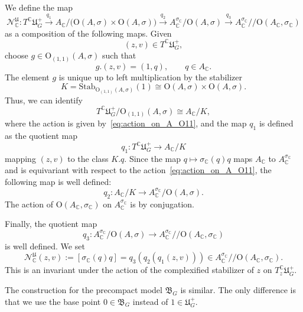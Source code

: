 \documentclass[oneside,11pt]{amsart}
\theoremstyle{definition}
\theoremstyle{remark}
\numberwithin{thm}{section}
\numberwithin{equation}{section}
\begin{document}
We define the map
\[
\mathcal N_{\mathbb{C}}^{\mathfrak U}: T^{\mathbb{C}}\mathfrak U_G^+\xrightarrow{q_1} A_{\mathbb{C}}/\bigl(\mathrm{O}(A,\sigma)\times\mathrm{O}(A,\sigma)\bigr)\xrightarrow{q_2}A_{\mathbb{C}}^{\sigma_{\mathbb{C}}}/\mathrm{O}(A,\sigma)\xrightarrow{q_3} A_{\mathbb{C}}^{\sigma_{\mathbb{C}}}/\!\!/\mathrm{O}(A_{\mathbb{C}},\sigma_{\mathbb{C}})
\]
as a composition of the following maps. Given
\[
(z,v)\in T^{\mathbb{C}}\mathfrak U_G^+,
\]
choose $g\in \mathrm{O}_{(1,1)}(A,\sigma)$ such that
\[
g.(z,v)=(1,q), \qquad q\in A_{\mathbb{C}}.
\]
The element $g$ is unique up to left multiplication by the stabilizer
\[
K=\mathrm{Stab}_{\mathrm{O}_{(1,1)}(A,\sigma)}(1)\cong\mathrm{O}(A,\sigma)\times\mathrm{O}(A,\sigma).
\]
Thus, we can identify
\[
T^{\mathbb{C}}\mathfrak U_G^+/\mathrm{O}_{(1,1)}(A,\sigma)\cong A_{\mathbb{C}}/K,
\]
where the action is given by~\eqref{eq:action_on_A_O11}, and the map $q_1$ is defined as the quotient map
\[
q_1: T^{\mathbb{C}}\mathfrak U_G^+\longrightarrow A_{\mathbb{C}}/K
\]
mapping $(z,v)$ to the class $K.q$. Since the map $q\longmapsto \sigma_{\mathbb{C}}(q)q$ maps $A_{\mathbb{C}}$ to $A_{\mathbb{C}}^{\sigma_{\mathbb{C}}}$ and is equivariant with respect to the action~\eqref{eq:action_on_A_O11}, the following map is well defined:
\[
q_2: A_{\mathbb{C}}/K\longrightarrow A_{\mathbb{C}}^{\sigma_{\mathbb{C}}}/\mathrm{O}(A,\sigma).
\]
The action of $\mathrm{O}(A_{\mathbb{C}},\sigma_{\mathbb{C}})$ on $A_{\mathbb{C}}^{\sigma_{\mathbb{C}}}$ is by conjugation.

Finally, the quotient map
\[
q_3: A_{\mathbb{C}}^{\sigma_{\mathbb{C}}}/\mathrm{O}(A,\sigma)\longrightarrow
A_{\mathbb{C}}^{\sigma_{\mathbb{C}}}/\!\!/\mathrm{O}(A_{\mathbb{C}},\sigma_{\mathbb{C}})
\]
is well defined. We set
\[
\mathcal{N}_{\mathbb{C}}^{\mathfrak U}(z,v) :=[\sigma_{\mathbb{C}}(q)q]= q_3(q_2(q_1(z,v)))\in A_{\mathbb{C}}^{\sigma_{\mathbb{C}}}/\!\!/\mathrm{O}(A_{\mathbb{C}},\sigma_{\mathbb{C}}).
\]
This is an invariant under the action of the complexified stabilizer of $z$ on $T_z^{\mathbb{C}}\mathfrak U_G^+$.

The construction for the precompact model $\mathfrak B_G$ is similar. The only difference is that we use the base point $0\in\mathfrak B_G$ instead of $1\in\mathfrak U_G^+$.
\end{document}
